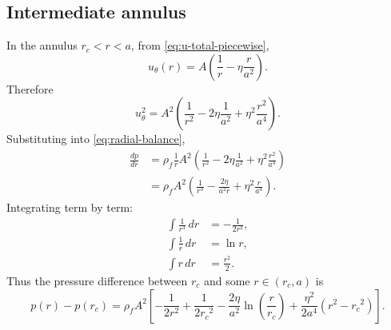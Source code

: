 \documentclass[11pt]{article}
\newcommand{\rhoF}{\rho_{\!f}}
\newcommand{\rc}{{r_c}}
\begin{document}
        \subsection{Intermediate annulus}
            
            In the annulus \(\rc<r<a\), from \eqref{eq:u-total-piecewise},
            \[
                u_\theta(r)=A\left(\frac{1}{r}-\eta \frac{r}{a^2}\right).
            \]
            Therefore
            \begin{equation}
                u_\theta^2
                =
                A^2\left(
                       \frac{1}{r^2}
                       -
                       2\eta \frac{1}{a^2}
                       +
                       \eta^2 \frac{r^2}{a^4}
                \right).
                \label{eq:u2-annulus}
            \end{equation}
            Substituting into \eqref{eq:radial-balance},
            \begin{align}
                \frac{dp}{dr}
                &=
                \rhoF \frac{1}{r}A^2\left(
                                        \frac{1}{r^2}
                                        -
                                        2\eta \frac{1}{a^2}
                                        +
                                        \eta^2 \frac{r^2}{a^4}
                \right)
                \\
                &=
                \rhoF A^2\left(
                             \frac{1}{r^3}
                             -
                             \frac{2\eta}{a^2 r}
                             +
                             \eta^2 \frac{r}{a^4}
                \right).
                \label{eq:dpdr-annulus}
            \end{align}
            Integrating term by term:
            \begin{align}
                \int \frac{1}{r^3}\,dr &= -\frac{1}{2r^2},
                \\
                \int \frac{1}{r}\,dr &= \ln r,
                \\
                \int r\,dr &= \frac{r^2}{2}.
            \end{align}
            Thus the pressure difference between \(\rc\) and some \(r\in(\rc,a)\) is
            \begin{equation}
                p(r)-p(\rc)
                =
                \rhoF A^2
                \left[
                    -\frac{1}{2r^2}+\frac{1}{2\rc^2}
                    -\frac{2\eta}{a^2}\ln\!\left(\frac{r}{\rc}\right)
                    +\frac{\eta^2}{2a^4}(r^2-\rc^2)
                \right].
                \label{eq:p-annulus}
            \end{equation}
        
\end{document}
